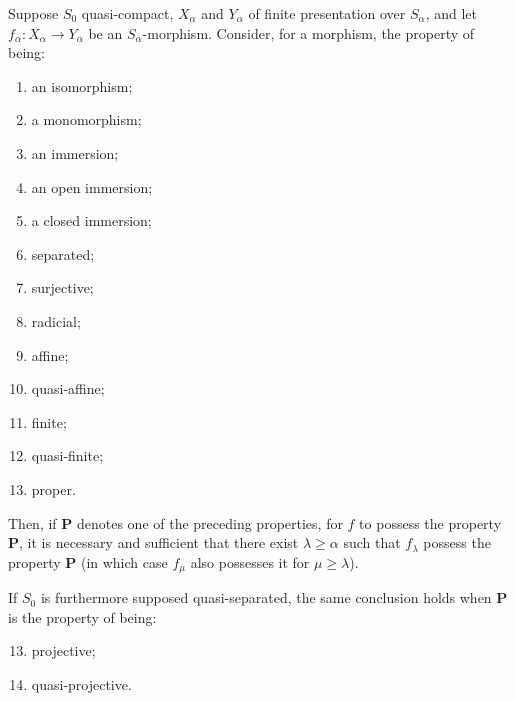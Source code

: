 \begin{theorem}[8.10.5]
\label{IV.8.10.5}
Suppose $S_0$ quasi-compact, $X_\alpha$ and $Y_\alpha$ of finite presentation over $S_\alpha$, and let $f_\alpha:X_\alpha\to Y_\alpha$ be an $S_\alpha$-morphism.
Consider, for a morphism, the property of being:
\begin{enumerate}[label=\textup{(\roman*)}]
\item an isomorphism;
\item[\rm(i\,\emph{bis})] a monomorphism;
\item an immersion;
\item an open immersion;
\item a closed immersion;
\item separated;
\item surjective;
\item radicial;
\item affine;
\item quasi-affine;
\item finite;
\item quasi-finite;
\item proper.
\end{enumerate}
Then, if $\boldsymbol{P}$ denotes one of the preceding properties, for $f$ to possess the property $\boldsymbol{P}$, it is necessary and sufficient that there exist $\lambda\geqslant\alpha$ such that $f_\lambda$ possess the property $\boldsymbol{P}$ (in which case $f_\mu$ also possesses it for $\mu\geqslant\lambda$).

If $S_0$ is furthermore supposed quasi-separated, the same conclusion holds when $\boldsymbol{P}$ is the property of being:
\begin{enumerate}[label=\textup{(\roman*)}]
\setcounter{enumi}{12}
\item projective;
\item quasi-projective.
\end{enumerate}
\end{theorem}

